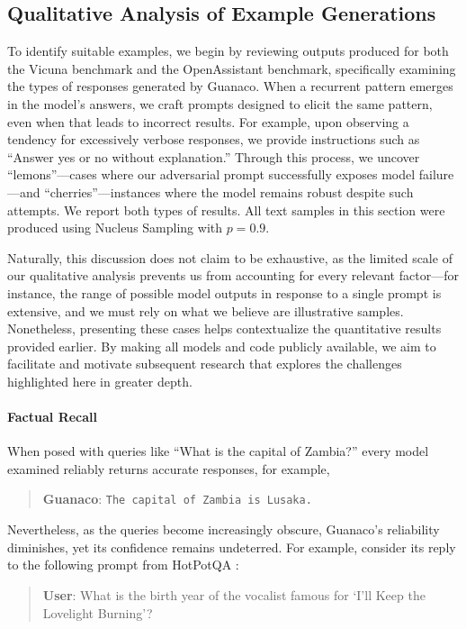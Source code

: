 \subsection{Qualitative Analysis of Example Generations}
\label{ssec:examples}

To identify suitable examples, we begin by reviewing outputs produced for both the Vicuna benchmark and the OpenAssistant benchmark, specifically examining the types of responses generated by {Guanaco}. When a recurrent pattern emerges in the model's answers, we craft prompts designed to elicit the same pattern, even when that leads to incorrect results. For example, upon observing a tendency for excessively verbose responses, we provide instructions such as ``Answer yes or no without explanation.'' Through this process, we uncover ``lemons''—cases where our adversarial prompt successfully exposes model failure—and ``cherries''—instances where the model remains robust despite such attempts. We report both types of results. All text samples in this section were produced using Nucleus Sampling \cite{holtzmancurious} with $p=0.9$.

Naturally, this discussion does not claim to be exhaustive, as the limited scale of our qualitative analysis prevents us from accounting for every relevant factor—for instance, the range of possible model outputs in response to a single prompt is extensive, and we must rely on what we believe are illustrative samples. Nonetheless, presenting these cases helps contextualize the quantitative results provided earlier. By making all models and code publicly available, we aim to facilitate and motivate subsequent research that explores the challenges highlighted here in greater depth.
\paragraph{Factual Recall} When posed with queries like ``What is the capital of Zambia?'' every model examined reliably returns accurate responses, for example,

\begin{quote} 
    \textbf{Guanaco}:
    \texttt{The capital of Zambia is Lusaka.}
\end{quote}

Nevertheless, as the queries become increasingly obscure, {Guanaco}'s reliability diminishes, yet its confidence remains undeterred. For example, consider its reply to the following prompt from HotPotQA \citep{yang2018hotpotqa}:

\begin{quote}
    \textbf{User}: What is the birth year of the vocalist famous for `I'll Keep the Lovelight Burning'? 
\end{quote}

